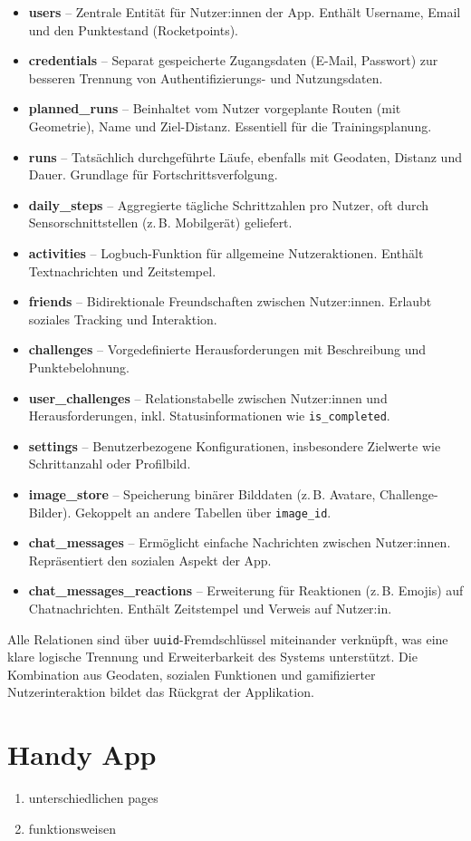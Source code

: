 \documentclass[11pt,a4paper]{article}
\begin{document}
\begin{itemize}
    \item \textbf{users} – Zentrale Entität für Nutzer:innen der App. Enthält Username, Email und den Punktestand (Rocketpoints).
    \item \textbf{credentials} – Separat gespeicherte Zugangsdaten (E-Mail, Passwort) zur besseren Trennung von Authentifizierungs- und Nutzungsdaten.
    \item \textbf{planned\_runs} – Beinhaltet vom Nutzer vorgeplante Routen (mit Geometrie), Name und Ziel-Distanz. Essentiell für die Trainingsplanung.
    \item \textbf{runs} – Tatsächlich durchgeführte Läufe, ebenfalls mit Geodaten, Distanz und Dauer. Grundlage für Fortschrittsverfolgung.
    \item \textbf{daily\_steps} – Aggregierte tägliche Schrittzahlen pro Nutzer, oft durch Sensorschnittstellen (z.\,B. Mobilgerät) geliefert.
    \item \textbf{activities} – Logbuch-Funktion für allgemeine Nutzeraktionen. Enthält Textnachrichten und Zeitstempel.
    \item \textbf{friends} – Bidirektionale Freundschaften zwischen Nutzer:innen. Erlaubt soziales Tracking und Interaktion.
    \item \textbf{challenges} – Vorgedefinierte Herausforderungen mit Beschreibung und Punktebelohnung.
    \item \textbf{user\_challenges} – Relationstabelle zwischen Nutzer:innen und Herausforderungen, inkl. Statusinformationen wie \texttt{is\_completed}.
    \item \textbf{settings} – Benutzerbezogene Konfigurationen, insbesondere Zielwerte wie Schrittanzahl oder Profilbild.
    \item \textbf{image\_store} – Speicherung binärer Bilddaten (z.\,B. Avatare, Challenge-Bilder). Gekoppelt an andere Tabellen über \texttt{image\_id}.
    \item \textbf{chat\_messages} – Ermöglicht einfache Nachrichten zwischen Nutzer:innen. Repräsentiert den sozialen Aspekt der App.
    \item \textbf{chat\_messages\_reactions} – Erweiterung für Reaktionen (z.\,B. Emojis) auf Chatnachrichten. Enthält Zeitstempel und Verweis auf Nutzer:in.
\end{itemize}

Alle Relationen sind über \texttt{uuid}-Fremdschlüssel miteinander verknüpft, was eine klare logische Trennung und Erweiterbarkeit des Systems unterstützt. Die Kombination aus Geodaten, sozialen Funktionen und gamifizierter Nutzerinteraktion bildet das Rückgrat der Applikation.



\section{Handy App}
\begin{enumerate}
    \item unterschiedlichen pages
    \item funktionsweisen
\end{enumerate}
\end{document}
